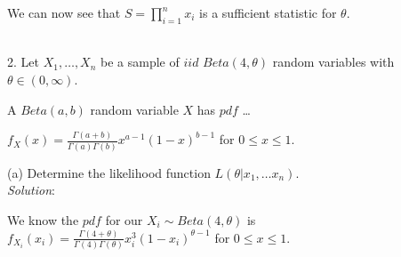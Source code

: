 \documentclass[12pt]{article}
\newcommand{\XB}{\color{black}}
\newcommand{\XBB}{\color{blue}}
\newcommand{\XV}{\color{violet}}
\begin{document}
\noindent
We can now see that $ \displaystyle S = \prod_{i=1}^{n} x_{i} $ is a sufficient statistic for $ \theta $.


\newpage
\XBB\hrulefill\XB \\

2. Let $ X_{1},\dots,X_{n} $ be a sample of $ iid $ $ Beta(4, \theta) $ random variables with $ \theta \in (0, \infty) $.

A $ Beta(a,b) $ random variable $ X $ has $ pdf $ \dots \\
\begin{center}
    $ \displaystyle f_{X}(x) = \frac{\Gamma(a + b)}{\Gamma(a)\Gamma(b)}x^{a - 1}(1 - x)^{b - 1} $ for $ 0 \leq x \leq 1 $. \\
\end{center}

\XBB\hrulefill\XB 
\vspace{5mm} 


(a) Determine the likelihood function $ L(\theta | x_{1}, \dots x_{n}) $.
\vspace{2.5mm} \\
\textit{Solution}:
\vspace{2.5mm}

\noindent 
We know the $ pdf $ for our $ \displaystyle X_{i} \sim Beta(4, \theta) $ is $ \displaystyle f_{X_{i}}(x_{i}) = \frac{\Gamma(4 + \theta)}{\Gamma(4)\Gamma(\theta)}x_{i}^{3}(1 - x_{i})^{\theta - 1} $ for $ 0 \leq x \leq 1 $. \\
\end{document}
